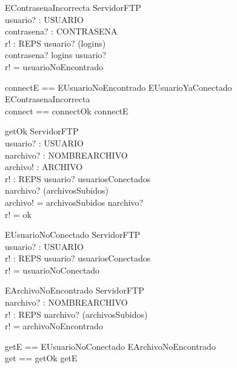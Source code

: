 \documentclass[11pt]{article}
\begin{document}
  \begin{schema}{EContrasenaIncorrecta}
  \Xi ServidorFTP \\
  usuario? : USUARIO \\
  contrasena? : CONTRASENA \\
  r! : REPS
  \where
  usuario? \in (\dom logins) \\
  contrasena? \neq logins \; usuario? \\
  r! = usuarioNoEncontrado
  \end{schema}
  
  \begin{zed}
  connectE == EUsuarioNoEncontrado \lor EUsuarioYaConectado \lor EContrasenaIncorrecta \\
  connect == connectOk \lor connectE
  \end{zed}
  
  \begin{schema}{getOk}
  \Xi ServidorFTP \\
  usuario? : USUARIO  \\
  narchivo? : NOMBREARCHIVO \\
  archivo! : ARCHIVO \\
  r! : REPS
  \where
  usuario? \in usuariosConectados \\
  narchivo? \in (\dom archivosSubidos) \\
  archivo! = archivosSubidos \; narchivo? \\
  r! = ok
  \end{schema}
  
  \begin{schema}{EUsuarioNoConectado}
  \Xi ServidorFTP \\
  usuario? : USUARIO \\
  r! : REPS
  \where
  usuario? \notin usuariosConectados \\
  r! = usuarioNoConectado
  \end{schema}
  
  \begin{schema}{EArchivoNoEncontrado}
  \Xi ServidorFTP \\
  narchivo? : NOMBREARCHIVO \\
  r! : REPS
  \where
  narchivo? \notin (\dom archivosSubidos) \\
  r! = archivoNoEncontrado
  \end{schema}
  
  \begin{zed}
  getE == EUsuarioNoConectado \lor EArchivoNoEncontrado \\
  get == getOk \lor getE
  \end{zed}
  
\end{document}
